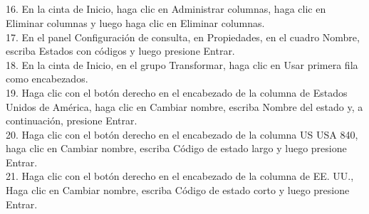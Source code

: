 \begin{flushleft}
\begin{itemize}
\textbf{ }\\
\textbf{ }\\
\textbf{ }\\
\textbf{ }\\
\textbf{ }\\
\textbf{ }\\
\textbf{ }\\
\textbf{ }\\
\textbf{ }\\
16. En la cinta de Inicio, haga clic en Administrar columnas, haga clic en Eliminar columnas y luego haga clic en Eliminar columnas.\\
17. En el panel Configuración de consulta, en Propiedades, en el cuadro Nombre, escriba Estados con códigos y luego presione
Entrar.\\
18. En la cinta de Inicio, en el grupo Transformar, haga clic en Usar primera fila como encabezados.\\
19. Haga clic con el botón derecho en el encabezado de la columna de Estados Unidos de América, haga clic en Cambiar nombre, escriba Nombre del estado y, a continuación, presione
Entrar.\\
20. Haga clic con el botón derecho en el encabezado de la columna US USA 840, haga clic en Cambiar nombre, escriba Código de estado largo y luego presione Entrar.\\
21. Haga clic con el botón derecho en el encabezado de la columna de EE. UU., Haga clic en Cambiar nombre, escriba Código de estado corto y luego presione Entrar.\\


\end{itemize}
\end{flushleft}
